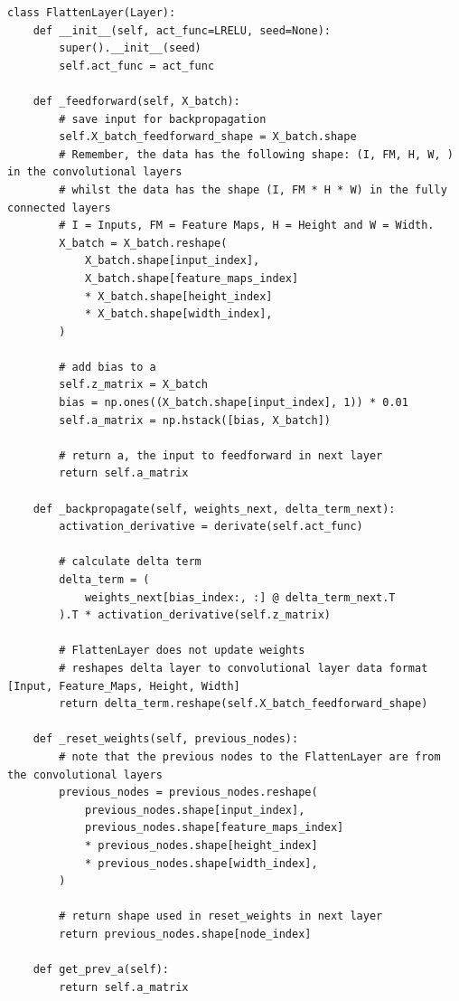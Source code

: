 \documentclass[%
oneside,                 %
final,                   %
10pt]{article}
\begin{document}
\begin{verbatim}
class FlattenLayer(Layer):
    def __init__(self, act_func=LRELU, seed=None):
        super().__init__(seed)
        self.act_func = act_func

    def _feedforward(self, X_batch):
        # save input for backpropagation
        self.X_batch_feedforward_shape = X_batch.shape
        # Remember, the data has the following shape: (I, FM, H, W, ) in the convolutional layers
        # whilst the data has the shape (I, FM * H * W) in the fully connected layers
        # I = Inputs, FM = Feature Maps, H = Height and W = Width.
        X_batch = X_batch.reshape(
            X_batch.shape[input_index],
            X_batch.shape[feature_maps_index]
            * X_batch.shape[height_index]
            * X_batch.shape[width_index],
        )

        # add bias to a
        self.z_matrix = X_batch
        bias = np.ones((X_batch.shape[input_index], 1)) * 0.01
        self.a_matrix = np.hstack([bias, X_batch])

        # return a, the input to feedforward in next layer
        return self.a_matrix

    def _backpropagate(self, weights_next, delta_term_next):
        activation_derivative = derivate(self.act_func)

        # calculate delta term
        delta_term = (
            weights_next[bias_index:, :] @ delta_term_next.T
        ).T * activation_derivative(self.z_matrix)

        # FlattenLayer does not update weights
        # reshapes delta layer to convolutional layer data format [Input, Feature_Maps, Height, Width]
        return delta_term.reshape(self.X_batch_feedforward_shape)

    def _reset_weights(self, previous_nodes):
        # note that the previous nodes to the FlattenLayer are from the convolutional layers
        previous_nodes = previous_nodes.reshape(
            previous_nodes.shape[input_index],
            previous_nodes.shape[feature_maps_index]
            * previous_nodes.shape[height_index]
            * previous_nodes.shape[width_index],
        )

        # return shape used in reset_weights in next layer
        return previous_nodes.shape[node_index]

    def get_prev_a(self):
        return self.a_matrix

\end{verbatim}
\end{document}
